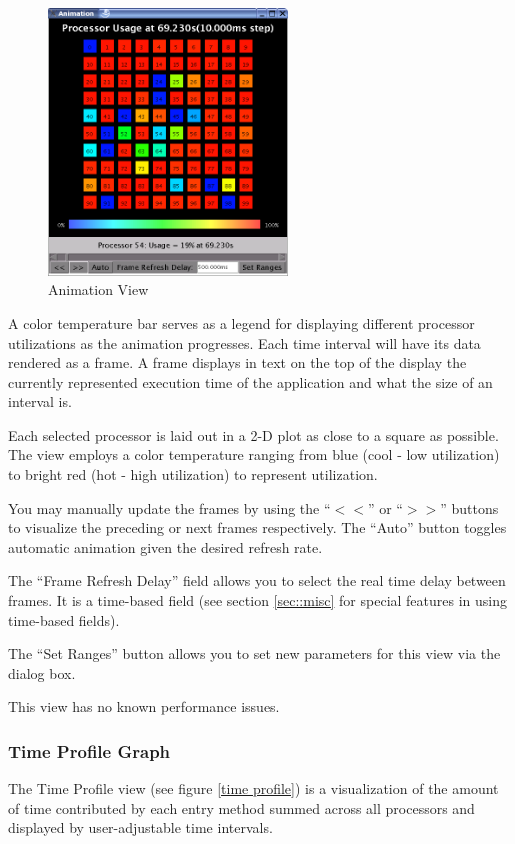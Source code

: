 \documentclass[10pt]{article}
\begin{document}
\begin{figure}[htb]
\center
\includegraphics[width=2.5in]{fig/animation}
\caption{Animation View}
\label{animation}
\end{figure}

A color temperature bar serves as a legend for displaying different
processor utilizations as the animation progresses. Each time interval
will have its data rendered as a frame. A frame displays in text on
the top of the display the currently represented execution time of the
application and what the size of an interval is.

Each selected processor is laid out in a 2-D plot as close to a square
as possible. The view employs a color temperature ranging from blue
(cool - low utilization) to bright red (hot - high utilization) to
represent utilization.

You may manually update the frames by using the ``$<<$'' or ``$>>$''
buttons to visualize the preceding or next frames respectively. The
``Auto'' button toggles automatic animation given the desired refresh
rate.

The ``Frame Refresh Delay'' field allows you to select the real time
delay between frames. It is a time-based field (see section
\ref{sec::misc} for special features in using time-based
fields).

The ``Set Ranges'' button allows you to set new parameters for this
view via the dialog box.

This view has no known performance issues.

\subsubsection{Time Profile Graph}

The Time Profile view (see figure \ref{time profile}) is a
visualization of the amount of time contributed by each entry method
summed across all processors and displayed by user-adjustable time
intervals.
\end{document}
